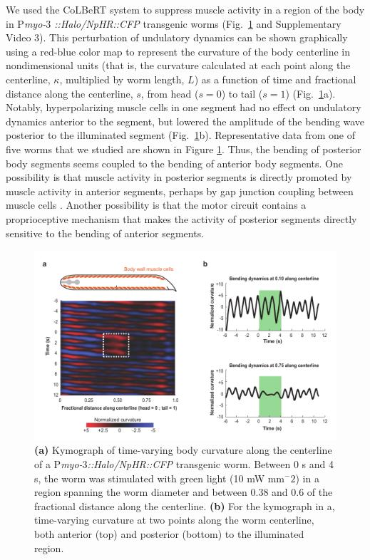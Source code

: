 We used the CoLBeRT system to suppress muscle activity in a region of the body in P\textit{myo-$3$ ::Halo/NpHR::CFP} transgenic worms (Fig.~\ref{fig:colbert2} and Supplementary Video 3). This perturbation of undulatory dynamics can be shown graphically using a red-blue color map to represent the curvature of the body centerline in nondimensional units (that is, the curvature calculated at each point along the centerline, $\kappa$, multiplied by worm length, $L$) as a function of time and fractional distance along the centerline, $s$, from head ($s = 0$) to tail ($s = 1$) (Fig.~\ref{fig:colbert2}a). Notably, hyperpolarizing muscle cells in one segment had no effect on undulatory dynamics anterior to the segment, but lowered the amplitude of the bending wave posterior to the illuminated segment (Fig.~\ref{fig:colbert2}b). Representative data from one of five worms that we studied are shown in Figure \ref{fig:colbert2}. Thus, the bending of posterior body segments seems coupled to the bending of anterior body segments. One possibility is that muscle activity in posterior segments is directly promoted by muscle activity in anterior segments, perhaps by gap junction coupling between muscle cells \citep{liu_low_2006}. Another possibility is that the motor circuit contains a proprioceptive mechanism that makes the activity of posterior segments directly sensitive to the bending of anterior segments.

\begin{figure} 
\includegraphics[width=\textwidth]{figures/colbert2}
\caption[Optogenetic inactivation of muscle cells.]{ \textbf{(a)} Kymograph of time-varying body curvature along the centerline of a P\textit{myo-$3$::Halo/NpHR::CFP} transgenic worm. Between 0 s and 4 s, the worm was stimulated with green light (10 mW mm$^-2$) in a region spanning the worm diameter and between 0.38 and 0.6 of the fractional distance along the centerline. \textbf{(b)} For the kymograph in a, time-varying curvature at two points along the worm centerline, both anterior (top) and posterior (bottom) to the illuminated region. \label{fig:colbert2}}
\end{figure}
